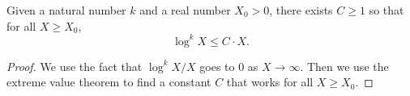 \begin{lemma}
\label{IBound_aux1}
\leanok
Given a natural number $k$ and a real number $X_0 > 0$, there exists $C \geq 1$ so that for all $X \geq X_0$,
  $$
  \log^k X \le C \cdot X.
  $$
\end{lemma}
\begin{proof}
\leanok
We use the fact that $\log^k X / X$ goes to $0$ as $X \to \infty$.
  Then we use the extreme value theorem to find a constant $C$ that works for all $X \geq X_0$.
\end{proof}
